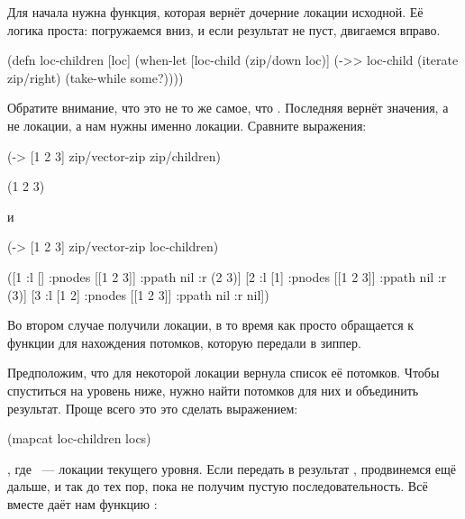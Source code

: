Для начала нужна функция, которая вернёт дочерние локации исходной. Её логика
проста: погружаемся вниз, и если результат не пуст, двигаемся вправо.

\begin{english}
  \begin{clojure}
(defn loc-children [loc]
  (when-let [loc-child (zip/down loc)]
    (->> loc-child
         (iterate zip/right)
         (take-while some?))))
  \end{clojure}
\end{english}

Обратите внимание, что это не то же самое, что . Последняя вернёт
значения, а не локации, а нам нужны именно локации. Сравните выражения:

\begin{english}
  \begin{clojure}
(-> [1 2 3]
    zip/vector-zip
    zip/children)

(1 2 3)
  \end{clojure}
\end{english}

\noindent
и

\begin{english}
  \begin{clojure}
(-> [1 2 3]
    zip/vector-zip
    loc-children)

([1 {:l [] :pnodes [[1 2 3]] :ppath nil :r (2 3)}]
 [2 {:l [1] :pnodes [[1 2 3]] :ppath nil :r (3)}]
 [3 {:l [1 2] :pnodes [[1 2 3]] :ppath nil :r nil}])
  \end{clojure}
\end{english}

Во втором случае получили локации, в то время как  просто
обращается к функции для нахождения потомков, которую передали в зиппер.

Предположим, что для некоторой локации  вернула список её
потомков. Чтобы спуститься на уровень ниже, нужно найти потомков для них и
объединить результат. Проще всего это это сделать выражением:

\begin{english}
  \begin{clojure}
(mapcat loc-children locs)
  \end{clojure}
\end{english}

\noindent
, где ~--- локации текущего уровня. Если передать в  результат
, продвинемся ещё дальше, и так до тех пор, пока не получим пустую
последовательность. Всё вместе даёт нам функцию :

